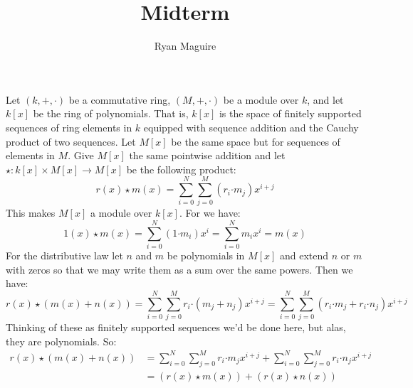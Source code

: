 \documentclass[crop=false,class=article]{standalone}                           %
\begin{document}
    \title{Midterm}
    \author{Ryan Maguire}
    \date{\vspace{-5ex}}
    \maketitle
    \section{}
        Let $(k,+,\cdot)$ be a commutative ring,
        $(M,\boldsymbol{+},\boldsymbol{\cdot})$ be a module over $k$, and let
        $k[x]$ be the ring of polynomials. That is, $k[x]$ is the space of
        finitely supported sequences of ring elements in $k$ equipped with
        sequence addition and the Cauchy product of two sequences. Let $M[x]$ be
        the same space but for sequences of elements in $M$. Give $M[x]$ the
        same pointwise addition and let
        $\star:k[x]\times{M}[x]\rightarrow{M}[x]$ be the following product:
        \begin{equation}
            r(x)\star{m}(x)=
            \sum_{i=0}^{N}\sum_{j=0}^{M}(r_{i}\boldsymbol{\cdot}m_{j})x^{i+j}
        \end{equation}
        This makes $M[x]$ a module over $k[x]$. For we have:
        \begin{equation}
            1(x)\star{m}(x)=\sum_{i=0}^{N}(1\boldsymbol{\cdot}m_{i})x^{i}
            =\sum_{i=0}^{N}m_{i}x^{i}
            =m(x)
        \end{equation}
        For the distributive law let $n$ and $m$ be polynomials in $M[x]$ and
        extend $n$ or $m$ with zeros so that we may write them as a sum over the
        same powers. Then we have:
        \begin{equation}
            r(x)\star(m(x)+n(x))=
            \sum_{i=0}^{N}\sum_{j=0}^{M}r_{i}
            \boldsymbol{\cdot}(m_{j}+n_{j})x^{i+j}
            =\sum_{i=0}^{N}\sum_{j=0}^{M}
                (r_{i}\boldsymbol{\cdot}m_{j}
                +r_{i}\boldsymbol{\cdot}n_{j})x^{i+j}
        \end{equation}
        Thinking of these as finitely supported sequences we'd be done here, but
        alas, they are polynomials. So:
        \begin{subequations}
            \begin{align}
                r(x)\star(m(x)+n(x))
                &=\sum_{i=0}^{N}\sum_{j=0}^{M}
                    r_{i}\boldsymbol{\cdot}m_{j}x^{i+j}
                    +\sum_{i=0}^{N}\sum_{j=0}^{M}
                    r_{i}\boldsymbol{\cdot}n_{j}x^{i+j}\\
                &=(r(x)\star{m}(x))+(r(x)\star{n}(x))
            \end{align}
        \end{subequations}
\end{document}
